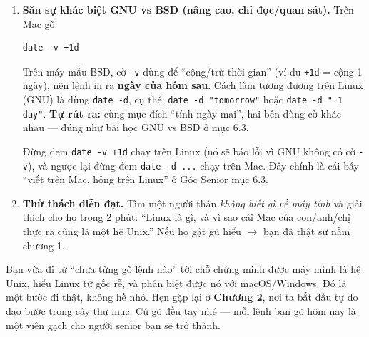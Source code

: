 \documentclass[12pt,a4paper]{article}
\begin{document}
\begin{enumerate}[leftmargin=*]
  \item \textbf{Săn sự khác biệt GNU vs BSD (nâng cao, chỉ đọc/quan sát).} Trên Mac gõ:
  \begin{labbox}[Lệnh]
\begin{verbatim}
date -v +1d
\end{verbatim}
  \end{labbox}
  Trên máy mẫu BSD, cờ \texttt{-v} dùng để ``cộng/trừ thời gian'' (ví dụ \texttt{+1d} = cộng 1 ngày), nên lệnh in ra \textbf{ngày của hôm sau}. Cách làm tương đương trên Linux (GNU) là dùng \texttt{date -d}, cụ thể: \texttt{date -d "tomorrow"} hoặc \texttt{date -d "+1 day"}. \textbf{Tự rút ra:} cùng mục đích ``tính ngày mai'', hai bên dùng cờ khác nhau — đúng như bài học GNU vs BSD ở mục 6.3.
  \begin{warnbox}[Lưu ý]
  Đừng đem \texttt{date -v +1d} chạy trên Linux (nó sẽ báo lỗi vì GNU không có cờ \texttt{-v}), và ngược lại đừng đem \texttt{date -d ...} chạy trên Mac. Đây chính là cái bẫy ``viết trên Mac, hỏng trên Linux'' ở Góc Senior mục 6.3.
  \end{warnbox}

  \item \textbf{Thử thách diễn đạt.} Tìm một người thân \textit{không biết gì về máy tính} và giải thích cho họ trong 2 phút: ``Linux là gì, và vì sao cái Mac của con/anh/chị thực ra cũng là một hệ Unix.'' Nếu họ gật gù hiểu $\rightarrow$ bạn đã thật sự nắm chương 1.
\end{enumerate}

\begin{seniorbox}
Bạn vừa đi từ ``chưa từng gõ lệnh nào'' tới chỗ chứng minh được máy mình là hệ Unix, hiểu Linux từ gốc rễ, và phân biệt được nó với macOS/Windows. Đó là một bước đi thật, không hề nhỏ. Hẹn gặp lại ở \textbf{Chương 2}, nơi ta bắt đầu tự do dạo bước trong cây thư mục. Cứ gõ đều tay nhé — mỗi lệnh bạn gõ hôm nay là một viên gạch cho người senior bạn sẽ trở thành.
\end{seniorbox}
\end{document}
